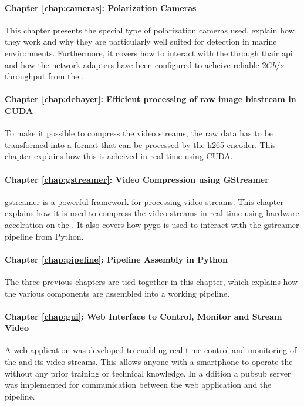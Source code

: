 \paragraph{Chapter \ref{chap:cameras}: Polarization Cameras}
This chapter presents the special type of polarization cameras used, explain how they work and why they are particularly well suited for detection in marine environments.
Furthermore, it covers how to interact with the \cams through thair \gls{api} and how the network adapters have been configured to acheive reliable $2Gb/s$ throughput from the \cams.

\paragraph{Chapter \ref{chap:debayer}: Efficient processing of raw image bitstream in CUDA}
To make it possible to compress the video streams, the raw data has to be transformed into a format that can be processed by the \gls{h265} encoder.
This chapter explains how this is acheived in real time using CUDA.

\paragraph{Chapter \ref{chap:gstreamer}: Video Compression using GStreamer}
\gls{gstreamer} is a powerful framework for processing video streams.
This chapter explains how it is used to compress the video streams in real time using hardware accelration on the \jx.
It also covers how \gls{pygo} is used to interact with the \gls{gstreamer} pipeline from Python.

\paragraph{Chapter \ref{chap:pipeline}: Pipeline Assembly in Python}
The three previous chapters are tied together in this chapter, which explains how the various components are assembled into a working pipeline.

\paragraph{Chapter \ref{chap:gui}: Web Interface to Control, Monitor and Stream Video}
A web application was developed to enabling real time control and monitoring of the \sr and its video streams.
This allows anyone with a smartphone to operate the \sr without any prior training or technical knowledge.
In a ddition a \gls{pubsub} server was implemented for communication between the web application and the pipeline.

